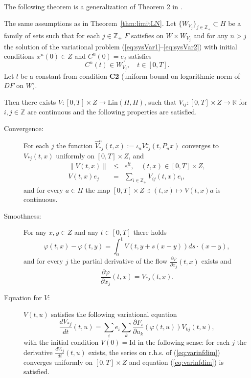 The following theorem is a generalization of Theorem 2 in \cite{Z1}.
\begin{theorem}
\label{thm:c1conver} The same assumptions as in Theorem~\ref{thm:limitLN}. Let $\{W_{V_j}\}_{j \in \mathbb{Z}_+}\subset H$ be a family of sets such that for each $j \in \mathbb{Z}_+$ $F$ satisfies \VL on $W \times W_{V_j}$ and for any $n >j$ the solution of the variational problem (\ref{eq:sysVar1}--\ref{eq:sysVar2}) with initial conditions $x^n(0) \in Z$ and $C^n(0)=e_j$ satisfies
\begin{equation}
  C^n(t) \in W_{V_j}, \quad t \in [0,T]. \label{eq:var-a-priori-bnds}
\end{equation}
Let $l$ be a constant from condition {\rm \textbf{C2}} (uniform bound on logarithmic norm of $DF$ on $W$).

Then there exists $V:[0,T] \times Z  \to \mathrm{Lin}(H,H)$, such that $V_{ij}:[0,T]\times Z \to {\mathbb R}$ for $i,j \in \mathbb{Z}$ are continuous and the following properties are satisfied.
\begin{description}
\item[Convergence:]
For each $j$ the function $\widehat{V}^n_{\ast j}(t,x):= \iota_n V^n_{\ast j}(t,P_n x)$ converges to $V_{\ast j}(t,x)$ uniformly on $[0,T] \times Z$, and
\begin{eqnarray*}
  \|V(t,x)\| &\leq& e^{l t}, \quad (t,x) \in [0,T] \times Z,\\
   V(t,x)e_j &=& \sum_{i\in\mathbb Z_+} V_{ij}(t,x)e_i,
\end{eqnarray*}
and for every $a \in H$ the map $[0,T] \times Z \ni (t,x) \mapsto V(t,x)a$ is continuous.


\item[Smoothness:] For any $x,y \in Z$ and any $t\in[0,T]$ there holds
\begin{equation}
  \varphi(t,x) - \varphi(t,y) =  \int^1_0 V(t,y+s(x-y))ds \cdot (x - y),
    \label{eq:intpar}
\end{equation}
and for every $j$ the partial derivative of the flow $\frac{\partial \varphi}{\partial x_j}(t,x)$ exists and
\begin{equation}
  \frac{\partial \varphi}{\partial x_j}(t,x)=V_{\ast j}(t,x).  \label{eq:dfiduj=Vij}
\end{equation}
\item[Equation for $V$:]  $V(t,u)$ satisfies the following variational equation
  \begin{equation}
     \frac{d V_{*j}}{dt}(t,u) = \sum_i e_i \sum_k \frac{\partial F_i}{\partial u_k}(\varphi(t,u))
           V_{kj}(t,u), \label{eq:varinfdim}
  \end{equation}
 with the initial condition $V(0)=\mathrm{Id}$ in the following sense:  for each $j$ the derivative  $\frac{d V_{*j}}{dt}(t,u)$ exists, the series on r.h.s. of (\ref{eq:varinfdim}) converges uniformly
 on $[0,T] \times Z$ and equation (\ref{eq:varinfdim}) is
 satisfied.
\end{description}
\end{theorem}
